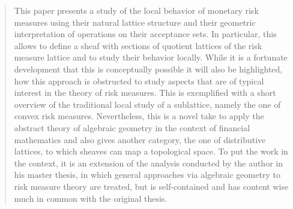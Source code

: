 \begin{abstract}
This paper presents a study of the local behavior of monetary risk measures using their natural lattice structure
and their geometric interpretation of operations on their acceptance sets. In particular, this allows to define
a sheaf with sections of quotient lattices of the risk measure lattice and to study their behavior locally.
While it is a fortunate development that this is conceptually possible it will also be highlighted, how this approach
is obstructed to study aspects that are of typical interest in the theory of risk measures. This is exemplified
with a short overview of the traditional local study of a sublattice, namely the one of convex risk measures.
Nevertheless, this is a novel take to apply the abstract theory of algebraic geometry in the context of financial mathematics
and also gives another category, the one of distributive lattices, to which sheaves can map a topological space.
To put the work in the context, it is an extension of the analysis conducted by the author in his master thesis, in
which general approaches via algebraic geometry to risk measure theory are treated, but is self-contained and has content  
wise much in common with the original thesis. 
\end{abstract}
